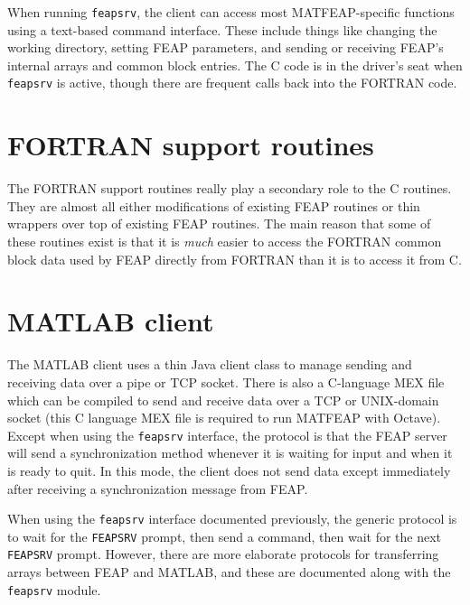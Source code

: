 \documentclass{report}
\begin{document}
When running {\tt feapsrv}, the client can access most
MATFEAP-specific functions using a text-based command interface.
These include things like changing the working directory, setting FEAP
parameters, and sending or receiving FEAP's internal arrays and common
block entries.  The C code is in the driver's seat when {\tt feapsrv}
is active, though there are frequent calls back into the FORTRAN code.




\chapter{FORTRAN support routines}

The FORTRAN support routines really play a secondary role to the C routines.
They are almost all either modifications of existing FEAP routines or thin
wrappers over top of existing FEAP routines.  The main reason that some of
these routines exist is that it is {\em much} easier to access the FORTRAN
common block data used by FEAP directly from FORTRAN than it is to access 
it from C.




\chapter{MATLAB client}

The MATLAB client uses a thin Java client class to manage sending and
receiving data over a pipe or TCP socket.  There is also a C-language
MEX file which can be compiled to send and receive data over a TCP or
UNIX-domain socket (this C language MEX file is required to run
MATFEAP with Octave).  Except when using the {\tt feapsrv} interface,
the protocol is that the FEAP server will send a synchronization
method whenever it is waiting for input and when it is ready to quit.
In this mode, the client does not send data except immediately after
receiving a synchronization message from FEAP.

When using the {\tt feapsrv} interface documented previously, the generic
protocol is to wait for the {\tt FEAPSRV} prompt, then send a command, then
wait for the next {\tt FEAPSRV} prompt.  However, there are more elaborate
protocols for transferring arrays between FEAP and MATLAB, and these are
documented along with the {\tt feapsrv} module.
\end{document}

